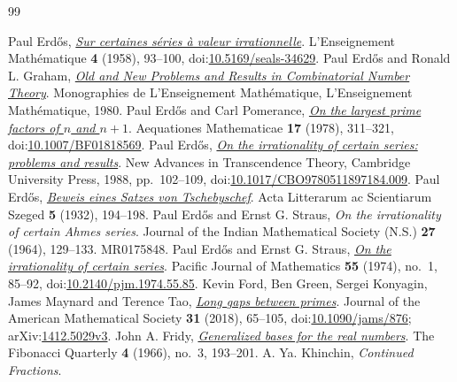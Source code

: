 \documentclass[11pt]{article}
\begin{document}
\begin{thebibliography}{99}
\small\raggedright\setlength{\itemsep}{0pt}
 Paul Erd\H{o}s, \href{https://users.renyi.hu/~p_erdos/1958-19.pdf}{\emph{Sur certaines s\'eries \`a valeur irrationnelle}}.
  L'Enseignement Mathématique \textbf{4} (1958), 93--100, doi:\href{https://doi.org/10.5169/seals-34629}{10.5169/seals-34629}.
 Paul Erd\H{o}s and Ronald L. Graham, \href{https://mathweb.ucsd.edu/~ronspubs/80_11_number_theory.pdf}{\emph{Old and New Problems and Results in Combinatorial Number Theory}}.
  Monographies de L'Enseignement Mathématique, L'Enseignement Mathématique, 1980.
 Paul Erd\H{o}s and Carl Pomerance, \href{https://doi.org/10.1007/BF01818569}{\emph{On the largest prime factors of $n$ and $n+1$}}.
  Aequationes Mathematicae \textbf{17} (1978), 311--321, doi:\href{https://doi.org/10.1007/BF01818569}{10.1007/BF01818569}.
 Paul Erd\H{o}s, \href{https://doi.org/10.1017/CBO9780511897184.009}{\emph{On the irrationality of certain series: problems and results}}.
  New Advances in Transcendence Theory, Cambridge University Press, 1988, pp.~102--109, doi:\href{https://doi.org/10.1017/CBO9780511897184.009}{10.1017/CBO9780511897184.009}.
 Paul Erd\H{o}s, \href{https://users.renyi.hu/~p_erdos/1932-01.pdf}{\emph{Beweis eines Satzes von Tschebyschef}}.
  Acta Litterarum ac Scientiarum Szeged \textbf{5} (1932), 194--198.
 Paul Erd\H{o}s and Ernst G. Straus, \emph{On the irrationality of certain Ahmes series}.
  Journal of the Indian Mathematical Society (N.S.) \textbf{27} (1964), 129--133. MR0175848.
 Paul Erd\H{o}s and Ernst G. Straus, \href{https://doi.org/10.2140/pjm.1974.55.85}{\emph{On the irrationality of certain series}}.
  Pacific Journal of Mathematics \textbf{55} (1974), no.~1, 85--92, doi:\href{https://doi.org/10.2140/pjm.1974.55.85}{10.2140/pjm.1974.55.85}.
 Kevin Ford, Ben Green, Sergei Konyagin, James Maynard and Terence Tao, \href{https://arxiv.org/abs/1412.5029v3}{\emph{Long gaps between primes}}.
  Journal of the American Mathematical Society \textbf{31} (2018), 65--105, doi:\href{https://doi.org/10.1090/jams/876}{10.1090/jams/876}; arXiv:\href{https://arxiv.org/abs/1412.5029v3}{1412.5029v3}.
 John A. Fridy, \href{https://www.fq.math.ca/Scanned/4-3/fridy.pdf}{\emph{Generalized bases for the real numbers}}.
  The Fibonacci Quarterly \textbf{4} (1966), no.~3, 193--201.
 A. Ya. Khinchin, \emph{Continued Fractions}.

\end{thebibliography}
\end{document}
